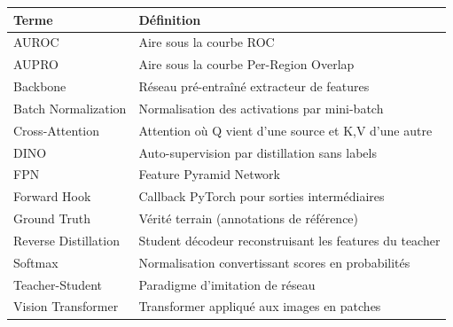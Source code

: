 \documentclass[12pt,a4paper,oneside]{report}
\begin{document}
\begin{longtable}{@{}p{4cm}p{10cm}@{}}
\toprule
\textbf{Terme} & \textbf{Définition} \\
\midrule
\endhead
AUROC & Aire sous la courbe ROC \\
AUPRO & Aire sous la courbe Per-Region Overlap \\
Backbone & Réseau pré-entraîné extracteur de features \\
Batch Normalization & Normalisation des activations par mini-batch \\
Cross-Attention & Attention où Q vient d'une source et K,V d'une autre \\
DINO & Auto-supervision par distillation sans labels \\
FPN & Feature Pyramid Network \\
Forward Hook & Callback PyTorch pour sorties intermédiaires \\
Ground Truth & Vérité terrain (annotations de référence) \\
Reverse Distillation & Student décodeur reconstruisant les features du teacher \\
Softmax & Normalisation convertissant scores en probabilités \\
Teacher-Student & Paradigme d'imitation de réseau \\
Vision Transformer & Transformer appliqué aux images en patches \\
\bottomrule
\end{longtable}
\end{document}

